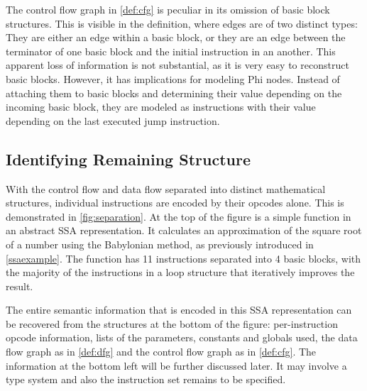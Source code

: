     The control flow graph in \autoref{def:cfg} is peculiar in its omission of
    basic block structures.
    This is visible in the definition, where edges are of two distinct types:
    They are either an edge within a basic block, or they are an edge between
    the terminator of one basic block and the initial instruction in an another.
    This apparent loss of information is not substantial, as it is very easy to
    reconstruct basic blocks.
    However, it has implications for modeling Phi nodes.
    Instead of attaching them to basic blocks and determining their value
    depending on the incoming basic block, they are modeled as instructions
    with their value depending on the last executed jump instruction.

\subsection{Identifying Remaining Structure}

    With the control flow and data flow separated into distinct mathematical
    structures, individual instructions are encoded by their opcodes alone.
    This is demonstrated in \autoref{fig:separation}.
    At the top of the figure is a simple function in an abstract SSA
    representation.
    It calculates an approximation of the square root of a number using the
    Babylonian method, as previously introduced in \autoref{ssaexample}.
    The function has 11 instructions separated into 4 basic blocks, with the
    majority of the instructions in a loop structure that iteratively improves
    the result.

    The entire semantic information that is encoded in this SSA representation
    can be recovered from the structures at the bottom of the figure:
    per-instruction opcode information, lists of the parameters, constants and
    globals used, the data flow graph as in \autoref{def:dfg} and the control
    flow graph as in \autoref{def:cfg}.
    The information at the bottom left will be further discussed later.
    It may involve a type system and also the instruction set remains to be
    specified.


